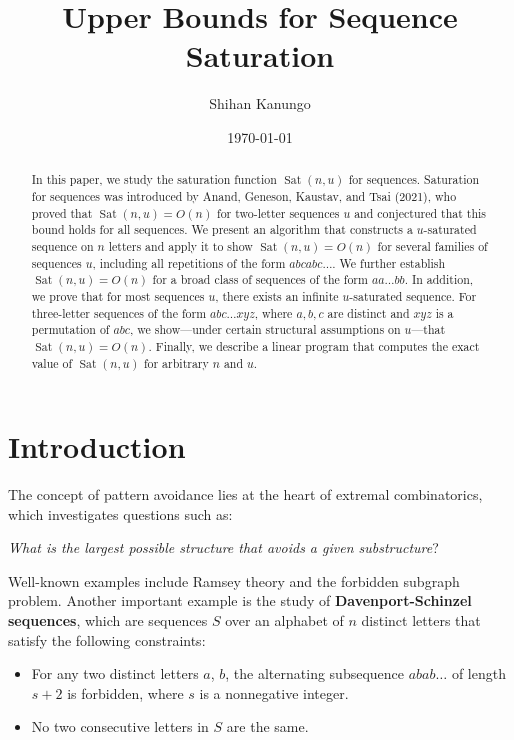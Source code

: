 \documentclass[12pt]{amsart}
\title{Upper Bounds for Sequence Saturation}
\author[Shihan Kanungo]{Shihan Kanungo}
\date{\today}
\DeclareMathOperator{\Sat}{Sat}
\theoremstyle{definition}
\numberwithin{equation}{section}
\numberwithin{table}{thm}
\begin{document}
\begin{abstract}
    In this paper, we study the saturation function $\Sat(n,u)$ for sequences. Saturation for sequences was introduced by Anand, Geneson, Kaustav, and Tsai (2021), who proved that $\Sat(n,u)=O(n)$ for two-letter sequences $u$ and conjectured that this bound holds for all sequences. We present an algorithm that constructs a $u$-saturated sequence on $n$ letters and apply it to show $\Sat(n,u)=O(n)$ for several families of sequences $u$, including all repetitions of the form $abcabc\dots$. We further establish $\Sat(n,u)=O(n)$ for a broad class of sequences of the form $aa\dots bb$. In addition, we prove that for most sequences $u$, there exists an infinite $u$-saturated sequence. For three-letter sequences of the form $abc\dots xyz$, where $a,b,c$ are distinct and $xyz$ is a permutation of $abc$, we show---under certain structural assumptions on $u$---that $\Sat(n,u)=O(n)$. Finally, we describe a linear program that computes the exact value of $\Sat(n,u)$ for arbitrary $n$ and $u$.
\end{abstract}
\maketitle

\section{Introduction}
The concept of pattern avoidance lies at the heart of extremal combinatorics, which investigates questions such as: \vskip 5pt
\begin{center}
    \textit{What is the largest possible structure that avoids a given substructure}?
\end{center}  \vskip 5pt
Well-known examples include Ramsey theory and the forbidden subgraph problem. Another important example is the study of \textbf{Davenport-Schinzel sequences}, which are sequences $S$ over an alphabet of $n$ distinct letters that satisfy the following constraints:
\begin{itemize}[topsep=5pt,itemsep=3pt]
    \item For any two distinct letters $a$, $b$, the alternating subsequence  $abab\dots$  of length \newline $s+2$ is forbidden, where $s$ is a nonnegative integer.
    \item No two consecutive letters in $S$ are the same.
\end{itemize}
\end{document}
